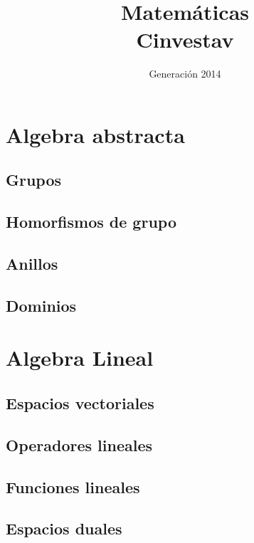 \documentclass{tufte-book}
\title{Matemáticas \\ Cinvestav}
\author{Generación 2014}
\numberwithin{equation}{chapter}
\begin{document}
  \maketitle
  \tableofcontents
  \part{Algebra abstracta}
    \chapter{Grupos}
      
      
      
      
    \chapter{Homorfismos de grupo}
      
    \chapter{Anillos}
      
      
    \chapter{Dominios}
  \part{Algebra Lineal}
    \chapter{Espacios vectoriales}
    
    
    
    
    \chapter{Operadores lineales}
    \chapter{Funciones lineales}
    \chapter{Espacios duales}
\end{document}
